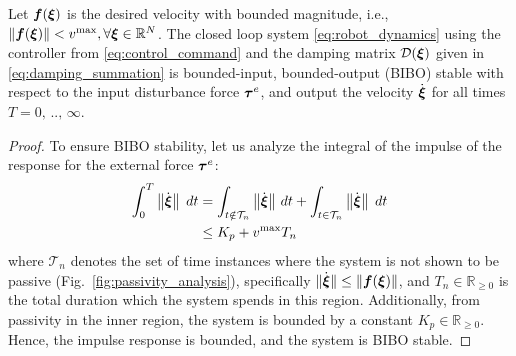\begin{theorem}  \label{theorem:passivity}
  Let $\boldsymbol{f}(\boldsymbol{\xi})$ is the desired velocity with bounded magnitude, i.e., $\| \boldsymbol{f}(\boldsymbol{\xi}) \| < v^{\mathrm{max}}, \forall \boldsymbol{\xi} \in \mathbb{R}^N$.
   The closed loop system \eqref{eq:robot_dynamics} using the controller from \eqref{eq:control_command} and the damping matrix $\mathcal{D}(\boldsymbol{\xi})$ given in \eqref{eq:damping_summation} is bounded-input, bounded-output (BIBO) stable with respect to the input disturbance force $\boldsymbol{\tau}^e$, and output the velocity $\dot{\boldsymbol{\xi}}$ for all times $T = 0, \, .., \, \infty$.
\end{theorem}
 
\begin{proof}

To ensure BIBO stability, let us analyze the integral of the impulse of the response for the external force $\boldsymbol{\tau}^e$: 
\begin{equation}
	\begin{split}
	  \int_{0}^{T} \left\| \dot{\vecs \xi} \right\| \; dt 
	  & = \int_{t \notin \mathcal{T}_n} \left\| \dot {\vecs \xi} \right\|  \, dt + \int_{t \in  \mathcal{T}_n} \left\| \dot {\vecs \xi} \right\| \;  dt \\ 
	  & \leq K_p + v^{\mathrm{max}} T_n
\end{split}
\label{eq:bibo_velocity}
\end{equation}
where $\mathcal{T}_n$ denotes the set of time instances where the system is not shown to be passive (Fig.~\ref{fig:passivity_analysis}), specifically $\| \dot{\boldsymbol{\xi}} \| \leq \| \boldsymbol{f} (\boldsymbol{\xi}) \|$, and $T_n \in \mathbb{R}_{\geq 0}$ is the total duration which the system spends in this region. Additionally, from passivity in the inner region, the system is bounded by a constant $K_p \in \mathbb{R}_{\geq 0}$.
Hence, the impulse response is bounded, and the system is BIBO stable.


\end{proof}
